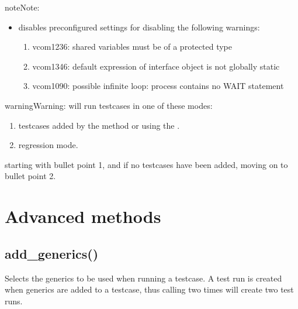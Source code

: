 \documentclass[letterpaper,10pt,english]{sphinxmanual}
\begin{document}
\begin{sphinxadmonition}{note}{Note:}
\begin{itemize}
\item {} 
\sphinxAtStartPar
{} disables preconfigured settings for disabling the following warnings:
\begin{enumerate}
%
\item {} 
\sphinxAtStartPar
vcom\sphinxhyphen{}1236: shared variables must be of a protected type

\item {} 
\sphinxAtStartPar
vcom\sphinxhyphen{}1346: default expression of interface object is not globally static

\item {} 
\sphinxAtStartPar
vcom\sphinxhyphen{}1090: possible infinite loop: process contains no WAIT statement

\end{enumerate}

\end{itemize}
\end{sphinxadmonition}

\begin{sphinxadmonition}{warning}{Warning:}
\sphinxAtStartPar
{} will run testcases in one of these modes:
\begin{enumerate}
%
\item {} 
\sphinxAtStartPar
testcases added by the {\hyperref[\detokenize{api:add-testcase}]{}} method or using the {\hyperref[\detokenize{cli::doc}]{}}.

\item {} 
\sphinxAtStartPar
regression mode.

\end{enumerate}

\sphinxAtStartPar
starting with bullet point 1, and if no testcases have been added, moving on to bullet point 2.
\end{sphinxadmonition}


\section{Advanced methods}
\label{\detokenize{api:advanced-methods}}

\subsection{add\_generics()}
\label{\detokenize{api:add-generics}}
\sphinxAtStartPar
Selects the generics to be used when running a testcase.
A test run is created when generics are added to a testcase, thus calling {\hyperref[\detokenize{api:add-generics}]{}} two times will create
two test runs.
\end{document}
